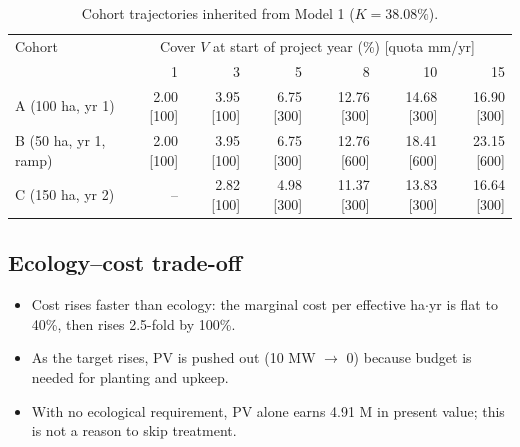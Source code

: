 \documentclass[11pt,a4paper]{article}
\begin{document}
\begin{table}[H]\centering\small
\begin{tabular}{@{}lrrrrrr@{}}
\toprule
Cohort & \multicolumn{6}{c}{Cover $V$ at start of project year (\%) [quota mm/yr]}\\
 & 1 & 3 & 5 & 8 & 10 & 15\\
\midrule
A (100 ha, yr 1) & 2.00 [100] & 3.95 [100] & 6.75 [300] & 12.76 [300] & 14.68 [300] & 16.90 [300]\\
B (50 ha, yr 1, ramp) & 2.00 [100] & 3.95 [100] & 6.75 [300] & 12.76 [600] & 18.41 [600] & 23.15 [600]\\
C (150 ha, yr 2) & -- & 2.82 [100] & 4.98 [300] & 11.37 [300] & 13.83 [300] & 16.64 [300]\\
\bottomrule
\end{tabular}
\caption{Cohort trajectories inherited from Model 1 ($K=38.08\%$).}
\end{table}

\subsection{Ecology--cost trade-off}
\begin{table}[H]\centering\small
{}
\caption{Six solved points (not a fitted curve). Marginal cost = change in $N$ / change in $H$ from the previous row.}
\label{tab:front}
\end{table}
\begin{itemize}
\item Cost rises faster than ecology: the marginal cost per effective ha$\cdot$yr is flat to 40\%, then rises 2.5-fold by 100\%.
\item As the target rises, PV is pushed out (10 MW $\to$ 0) because budget is needed for planting and upkeep.
\item With no ecological requirement, PV alone earns 4.91 M in present value; this is not a reason to skip treatment.
\end{itemize}
\end{document}
